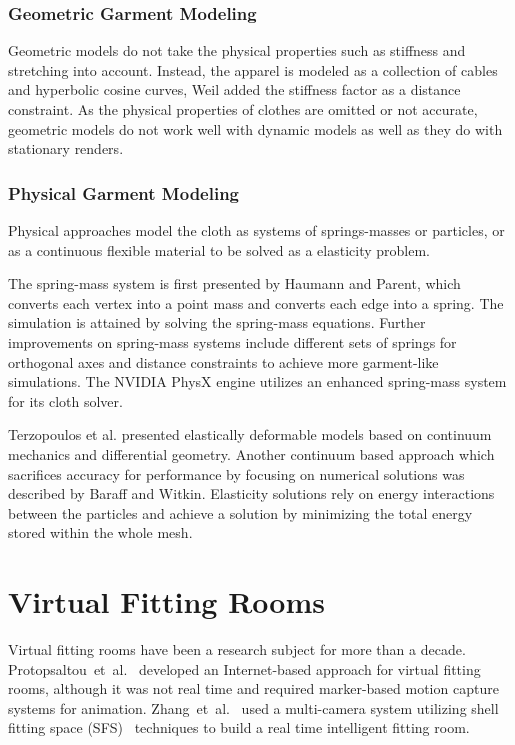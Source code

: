 \subsubsection{Geometric Garment Modeling}
Geometric models 
do not take the physical properties such as stiffness and stretching into account. Instead, the apparel is modeled as a collection of cables and hyperbolic cosine curves, Weil added the stiffness
factor as a distance constraint\cite{Weil1986}. As the physical properties of clothes are omitted or not accurate, geometric models do not work well with dynamic models as well as they do with 
stationary renders\cite{Weil1986}.

\subsubsection{Physical Garment Modeling}
Physical approaches model the cloth as systems of springs-masses or particles, or as a continuous flexible material to be solved as a elasticity problem.

The spring-mass system is first presented by Haumann and Parent\cite{Haumann1988}, which converts 
each vertex into a point mass and converts each edge into a spring. The simulation is attained by solving the spring-mass equations. Further improvements on spring-mass systems include
different sets of springs for orthogonal axes and distance constraints to achieve more garment-like simulations\cite{Provot1996}. The NVIDIA PhysX engine utilizes an enhanced 
spring-mass system for its cloth solver\cite{Kim2011}.

Terzopoulos et al.\cite{Terzopoulos1987} presented elastically deformable models based on continuum mechanics and differential geometry. Another continuum based approach which 
sacrifices accuracy for performance by focusing on numerical solutions was described by Baraff and Witkin\cite{Baraff1998}. Elasticity solutions rely on energy interactions between 
the particles and achieve a solution by minimizing the total energy stored within the whole mesh.

\section{Virtual Fitting Rooms}
\label{section_related_virtual_fitting}

Virtual fitting rooms have been a research subject for more than a decade. Protopsaltou~et~al.~\cite{Protopsaltou2002} developed an Inter\-net-based approach 
for virtual fitting rooms, although it was not real time and required marker-based motion capture systems for animation. Zhang~et~al.~\cite{Zhang2008} used a 
multi-camera system utilizing shell fitting space (SFS)~\cite{Cheung2005} techniques to build a real time intelligent fitting room.

